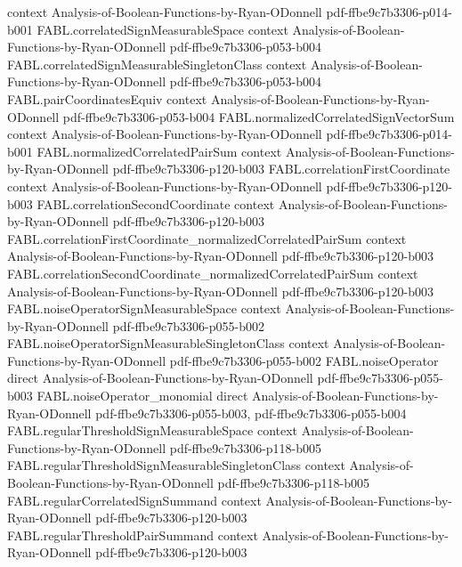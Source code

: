 \begin{theorem}
  {context}
  {Analysis-of-Boolean-Functions-by-Ryan-ODonnell}
  {pdf-ffbe9c7b3306-p014-b001}
\proofstep
  {FABL.correlatedSignMeasurableSpace}
  {context}
  {Analysis-of-Boolean-Functions-by-Ryan-ODonnell}
  {pdf-ffbe9c7b3306-p053-b004}
\proofstep
  {FABL.correlatedSignMeasurableSingletonClass}
  {context}
  {Analysis-of-Boolean-Functions-by-Ryan-ODonnell}
  {pdf-ffbe9c7b3306-p053-b004}
\proofstep
  {FABL.pairCoordinatesEquiv}
  {context}
  {Analysis-of-Boolean-Functions-by-Ryan-ODonnell}
  {pdf-ffbe9c7b3306-p053-b004}
\proofstep
  {FABL.normalizedCorrelatedSignVectorSum}
  {context}
  {Analysis-of-Boolean-Functions-by-Ryan-ODonnell}
  {pdf-ffbe9c7b3306-p014-b001}
\proofstep
  {FABL.normalizedCorrelatedPairSum}
  {context}
  {Analysis-of-Boolean-Functions-by-Ryan-ODonnell}
  {pdf-ffbe9c7b3306-p120-b003}
\proofstep
  {FABL.correlationFirstCoordinate}
  {context}
  {Analysis-of-Boolean-Functions-by-Ryan-ODonnell}
  {pdf-ffbe9c7b3306-p120-b003}
\proofstep
  {FABL.correlationSecondCoordinate}
  {context}
  {Analysis-of-Boolean-Functions-by-Ryan-ODonnell}
  {pdf-ffbe9c7b3306-p120-b003}
\proofstep
  {FABL.correlationFirstCoordinate_normalizedCorrelatedPairSum}
  {context}
  {Analysis-of-Boolean-Functions-by-Ryan-ODonnell}
  {pdf-ffbe9c7b3306-p120-b003}
\proofstep
  {FABL.correlationSecondCoordinate_normalizedCorrelatedPairSum}
  {context}
  {Analysis-of-Boolean-Functions-by-Ryan-ODonnell}
  {pdf-ffbe9c7b3306-p120-b003}
\proofstep
  {FABL.noiseOperatorSignMeasurableSpace}
  {context}
  {Analysis-of-Boolean-Functions-by-Ryan-ODonnell}
  {pdf-ffbe9c7b3306-p055-b002}
\proofstep
  {FABL.noiseOperatorSignMeasurableSingletonClass}
  {context}
  {Analysis-of-Boolean-Functions-by-Ryan-ODonnell}
  {pdf-ffbe9c7b3306-p055-b002}
\proofstep
  {FABL.noiseOperator}
  {direct}
  {Analysis-of-Boolean-Functions-by-Ryan-ODonnell}
  {pdf-ffbe9c7b3306-p055-b003}
\proofstep
  {FABL.noiseOperator_monomial}
  {direct}
  {Analysis-of-Boolean-Functions-by-Ryan-ODonnell}
  {pdf-ffbe9c7b3306-p055-b003,
    pdf-ffbe9c7b3306-p055-b004}
\proofstep
  {FABL.regularThresholdSignMeasurableSpace}
  {context}
  {Analysis-of-Boolean-Functions-by-Ryan-ODonnell}
  {pdf-ffbe9c7b3306-p118-b005}
\proofstep
  {FABL.regularThresholdSignMeasurableSingletonClass}
  {context}
  {Analysis-of-Boolean-Functions-by-Ryan-ODonnell}
  {pdf-ffbe9c7b3306-p118-b005}
\proofstep
  {FABL.regularCorrelatedSignSummand}
  {context}
  {Analysis-of-Boolean-Functions-by-Ryan-ODonnell}
  {pdf-ffbe9c7b3306-p120-b003}
\proofstep
  {FABL.regularThresholdPairSummand}
  {context}
  {Analysis-of-Boolean-Functions-by-Ryan-ODonnell}
  {pdf-ffbe9c7b3306-p120-b003}

\end{theorem}
